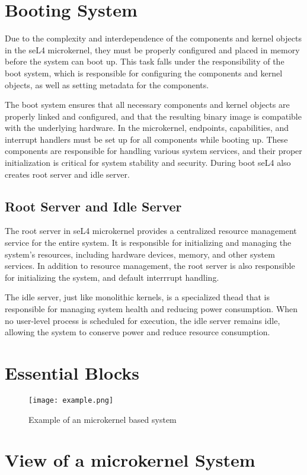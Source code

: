 \documentclass[
	a4paper, %
	11pt, %
	unnumberedsections, %
	twoside, %
]{LTJournalArticle}
\begin{document}
\section{Booting System}

Due to the complexity and interdependence of the components and kernel objects in the seL4 microkernel, they must be properly configured and placed in memory before the system can boot up. This task falls under the responsibility of the boot system, which is responsible for configuring the components and kernel objects, as well as setting metadata for the components.

The boot system ensures that all necessary components and kernel objects are properly linked and configured, and that the resulting binary image is compatible with the underlying hardware. In the microkernel, endpoints, capabilities, and interrupt handlers must be set up for all components while booting up. These components are responsible for handling various system services, and their proper initialization is critical for system stability and security. During boot seL4 also creates root server and idle server.

\subsection{Root Server and Idle Server}

The root server in seL4 microkernel provides a centralized resource management service for the entire system. It is responsible for initializing and managing the system's resources, including hardware devices, memory, and other system services. In addition to resource management, the root server is also responsible for initializing the system, and default interrrupt handling.

The idle server, just like monolithic kernels, is a specialized thead that is responsible for managing system health and reducing power consumption. When no user-level process is scheduled for execution, the idle server remains idle, allowing the system to conserve power and reduce resource consumption.

\section{Essential Blocks}

\begin{figure*} %
	\texttt{[image: example.png]}
	\caption{Example of an microkernel based system}
	\label{fig:example}
\end{figure*}

\section{View of a microkernel System}


\newpage


\printbibliography%
\end{document}
